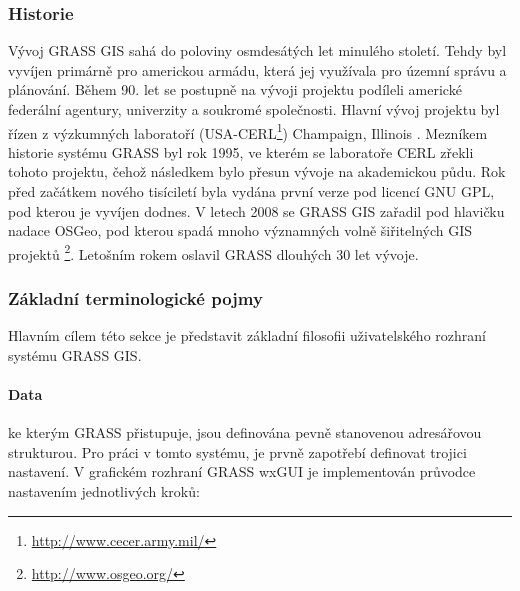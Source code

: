 \documentclass[a4paper,12pt,oneside]{report}
\begin{document}
\subsubsection*{Historie}
Vývoj GRASS GIS sahá do poloviny osmdesátých let minulého
století. Tehdy byl vyvíjen primárně pro americkou armádu, která jej
využívala pro územní správu a plánování. Během 90. let se postupně na
vývoji projektu podíleli americké federální agentury, univerzity a
soukromé společnosti. Hlavní vývoj projektu byl řízen z výzkumných
laboratoří (USA-CERL\footnote{\url{http://www.cecer.army.mil/}})
Champaign, Illinois \cite{grasshist}.  Mezníkem historie systému GRASS byl
rok 1995, ve kterém se laboratoře CERL zřekli tohoto projektu, čehož
následkem bylo přesun vývoje na akademickou půdu. Rok před začátkem
nového tisíciletí byla vydána první verze pod licencí GNU GPL, pod
kterou je vyvíjen dodnes. V letech 2008 se GRASS GIS zařadil pod hlavičku nadace
   \acs{OSGeo}, pod kterou spadá mnoho významných volně šiřitelných
GIS
projektů \footnote{\url{http://www.osgeo.org/}}. Letošním rokem
oslavil GRASS dlouhých 30 let vývoje.
\subsubsection*{Základní terminologické pojmy}
\label{subsubsec:grassterminologie}
Hlavním cílem této sekce je představit základní filosofii
uživatelského rozhraní systému GRASS GIS.
\paragraph*{Data} ke kterým GRASS přistupuje, jsou definována pevně
stanovenou adresářovou strukturou. Pro práci v tomto systému, je prvně
zapotřebí definovat trojici nastavení. V grafickém rozhraní GRASS
   \acs{wxGUI} je implementován průvodce nastavením jednotlivých kroků:
\end{document}
